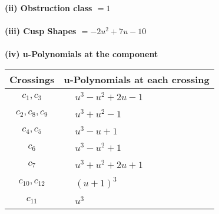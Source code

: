 \documentclass[1p]{elsarticle_modified}
\theoremstyle{definition}
\begin{document}
\flushleft \textbf{(ii) Obstruction class $= 1$}\\~\\
\flushleft \textbf{(iii) Cusp Shapes $= -2 u^2+7 u-10$}\\~\\
\newpage\renewcommand{\arraystretch}{1}
\flushleft \textbf{(iv) u-Polynomials at the component}\newline \\
\begin{tabular}{m{50pt}|m{274pt}}
Crossings & \hspace{64pt}u-Polynomials at each crossing \\
\hline $$\begin{aligned}c_{1},c_{3}\end{aligned}$$&$\begin{aligned}
&u^3- u^2+2 u-1
\end{aligned}$\\
\hline $$\begin{aligned}c_{2},c_{8},c_{9}\end{aligned}$$&$\begin{aligned}
&u^3+u^2-1
\end{aligned}$\\
\hline $$\begin{aligned}c_{4},c_{5}\end{aligned}$$&$\begin{aligned}
&u^3- u+1
\end{aligned}$\\
\hline $$\begin{aligned}c_{6}\end{aligned}$$&$\begin{aligned}
&u^3- u^2+1
\end{aligned}$\\
\hline $$\begin{aligned}c_{7}\end{aligned}$$&$\begin{aligned}
&u^3+u^2+2 u+1
\end{aligned}$\\
\hline $$\begin{aligned}c_{10},c_{12}\end{aligned}$$&$\begin{aligned}
&(u+1)^3
\end{aligned}$\\
\hline $$\begin{aligned}c_{11}\end{aligned}$$&$\begin{aligned}
&u^3
\end{aligned}$\\
\hline
\end{tabular}\\~\\
\end{document}
